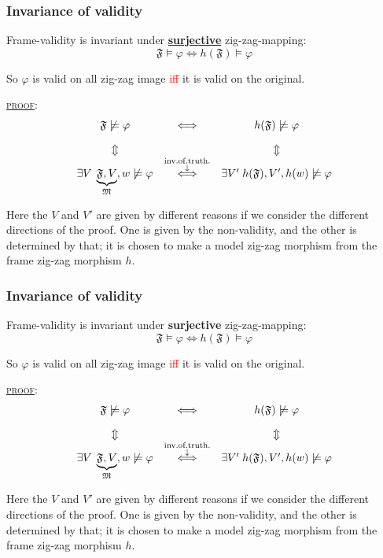 \documentclass[xcolor=x11names]{beamer}
\newcommand{\cemph}[1]{\textcolor{red}{#1}}
\renewcommand{\emph}[1]{\textbf{#1}}
\newcommand{\dzsa}[1]{\textsc{\underline{#1}}:}
\newcommand{\magyarazat}[2]{\overset{\substack{\textup{#2}\\ \downarrow}}{#1}}
\begin{document}
\begin{frame}
\frametitle{Invariance of validity}
Frame-validity is invariant under \underline{\emph{surjective}} zig-zag-mapping:
\[ \mathfrak F \models \varphi \iff h(\mathfrak F) \models \varphi \]

\textup{So $\varphi$
is valid on all zig-zag image } \cemph{iff} \textup{it is valid on the original.}

\dzsa{proof}
{\footnotesize
	\[ \begin{array}{ccccc}
		\mathfrak F \not \models \varphi 	& 	\iff 	& h(\mathfrak F) \not \models \varphi
	\\[1em] 	\Updownarrow & & \Updownarrow
	\\ 	\exists V\;\underbrace{\mathfrak F, V}_{\mathfrak M}, w \not \models \varphi & 	\magyarazat{\iff}{inv.of.truth.} 	& \exists V' \; h(\mathfrak F),  V', h(w) \not \models \varphi
		\end{array}\]}

Here the $V$ and $V'$ are given by different reasons if we consider the different directions of the proof. One is given by the non-validity, and the other is determined by that; it is chosen to make a model zig-zag morphism from the frame zig-zag morphism $h$.
\end{frame}


\begin{frame}
\frametitle{Invariance of validity}
Frame-validity is invariant under \emph{surjective} zig-zag-mapping:
\[ \mathfrak F \models \varphi \iff h(\mathfrak F) \models \varphi \]

\textup{So $\varphi$
is valid on all zig-zag image } \cemph{iff} \textup{it is valid on the original.}

\dzsa{proof}
{\footnotesize
	\[ \begin{array}{ccccc}
		\mathfrak F \not \models \varphi 	& 	\iff 	& h(\mathfrak F) \not \models \varphi
	\\[1em] 	\Updownarrow & & \Updownarrow
	\\ 	\exists V\;\underbrace{\mathfrak F, V}_{\mathfrak M}, w \not \models \varphi & 	\magyarazat{\iff}{inv.of.truth.} 	& \exists V' \; h(\mathfrak F),  V', h(w) \not \models \varphi
		\end{array}\]}

Here the $V$ and $V'$ are given by different reasons if we consider the different directions of the proof. One is given by the non-validity, and the other is determined by that; it is chosen to make a model zig-zag morphism from the frame zig-zag morphism $h$.
\end{frame}
\end{document}
